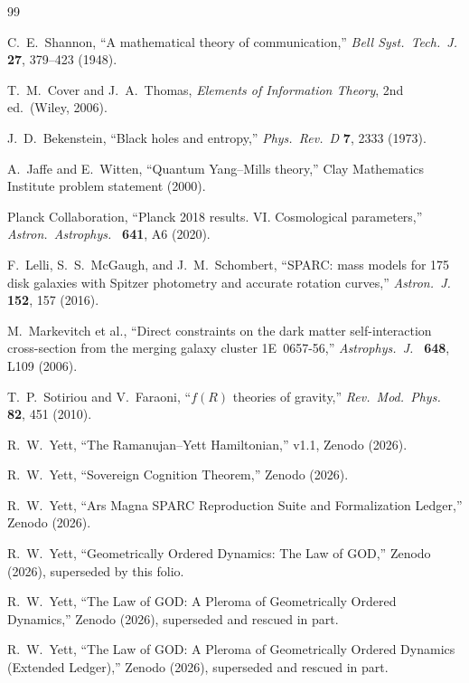 \documentclass{alienfolio}
\begin{document}
\begin{thebibliography}{99}

 C.~E.~Shannon, ``A mathematical theory of
communication,'' \emph{Bell Syst.\ Tech.\ J.} \textbf{27}, 379--423
(1948).

 T.~M.~Cover and J.~A.~Thomas, \emph{Elements of
Information Theory}, 2nd ed.\ (Wiley, 2006).

 J.~D.~Bekenstein, ``Black holes and entropy,''
\emph{Phys.\ Rev.\ D} \textbf{7}, 2333 (1973).

 A.~Jaffe and E.~Witten, ``Quantum Yang--Mills
theory,'' Clay Mathematics Institute problem statement (2000).

 Planck Collaboration, ``Planck 2018 results. VI.
Cosmological parameters,'' \emph{Astron.\ Astrophys.\ } \textbf{641},
A6 (2020).

 F.~Lelli, S.~S.~McGaugh, and J.~M.~Schombert,
``SPARC: mass models for 175 disk galaxies with Spitzer photometry
and accurate rotation curves,'' \emph{Astron.\ J.\ } \textbf{152}, 157
(2016).

 M.~Markevitch et al., ``Direct constraints on
the dark matter self-interaction cross-section from the merging
galaxy cluster 1E~0657-56,'' \emph{Astrophys.\ J.\ } \textbf{648},
L109 (2006).

 T.~P.~Sotiriou and V.~Faraoni, ``$f(R)$ theories
of gravity,'' \emph{Rev.\ Mod.\ Phys.\ } \textbf{82}, 451 (2010).

 R.~W.~Yett, ``The Ramanujan--Yett Hamiltonian,''
v1.1, Zenodo  (2026).

 R.~W.~Yett, ``Sovereign Cognition Theorem,''
Zenodo  (2026).

 R.~W.~Yett, ``Ars Magna SPARC Reproduction Suite and
Formalization Ledger,'' Zenodo  (2026).

 R.~W.~Yett, ``Geometrically Ordered Dynamics:
The Law of GOD,'' Zenodo  (2026),
superseded by this folio.

 R.~W.~Yett, ``The Law of GOD: A Pleroma of
Geometrically Ordered Dynamics,'' Zenodo 
(2026), superseded and rescued in part.

 R.~W.~Yett, ``The Law of GOD: A Pleroma of
Geometrically Ordered Dynamics (Extended Ledger),'' Zenodo
 (2026), superseded and rescued in part.


\end{thebibliography}
\end{document}
